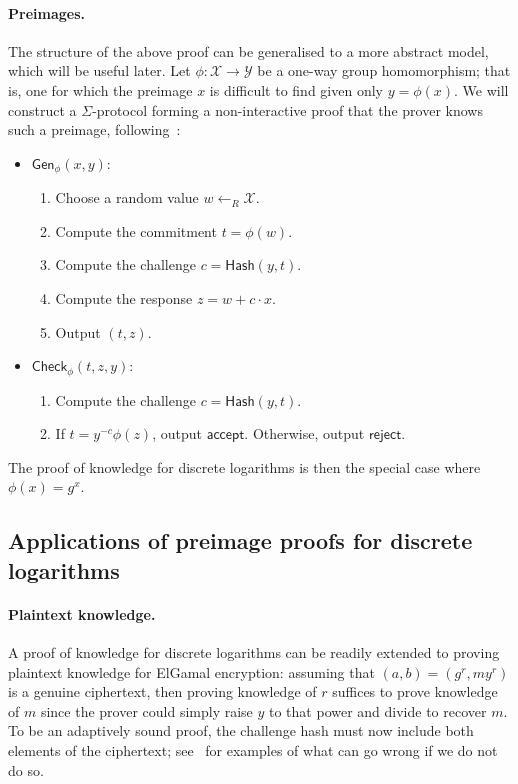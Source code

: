 \documentclass[12pt,a4paper]{article}
\theoremstyle{definition}
\begin{document}
\paragraph{Preimages.}\label{sec-preimage}
The structure of the above proof can be generalised to a more abstract model, which will be useful later. Let $\phi:\mathcal{X}\rightarrow \mathcal{Y}$ be a one-way group homomorphism; that is, one for which the preimage $x$ is difficult to find given only $y=\phi(x)$. We will construct a $\Sigma$-protocol forming a non-interactive proof that the prover knows such a preimage, following~\cite{haenni2017pseudo}:
\begin{itemize}
    \item $\mathsf{Gen}_\phi(x, y)$:
    \begin{enumerate}
        \item Choose a random value $w\gets_R \mathcal{X}$.
        \item Compute the commitment $t = \phi(w)$.
        \item Compute the challenge $c = \mathsf{Hash}(y, t)$.
        \item Compute the response $z = w + c\cdot x$.
        \item Output $(t, z)$.
    \end{enumerate}
    \item $\mathsf{Check}_\phi(t, z, y)$:
    \begin{enumerate}
        \item Compute the challenge $c = \mathsf{Hash}(y, t)$.
        \item If $t=y^{-c}\phi(z)$, output $\mathsf{accept}$. Otherwise, output $\mathsf{reject}$.
    \end{enumerate}
\end{itemize}
The proof of knowledge for discrete logarithms is then the special case where $\phi(x) = g^x$.

\subsection{Applications of preimage proofs for discrete logarithms}\label{sec-plaintext-knowledge}
\paragraph{Plaintext knowledge.}
A proof of knowledge for discrete logarithms can be readily extended to proving plaintext knowledge for ElGamal encryption: assuming that $(a, b) = (g^r, my^r)$ is a genuine ciphertext, then proving knowledge of $r$ suffices to prove knowledge of $m$ since the prover could simply raise $y$ to that power and divide to recover $m$. To be an adaptively sound proof, the challenge hash must now include both elements of the ciphertext; see~\cite{mcmurtry2020test} for examples of what can go wrong if we do not do so.  
\end{document}
